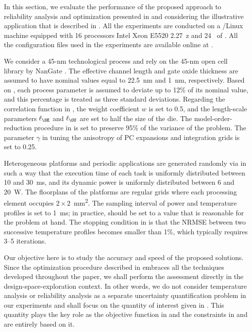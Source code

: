 In this section, we evaluate the performance of the proposed approach to
reliability analysis and optimization presented in
 and 
considering the illustrative application that is described in
. All the experiments are conducted on a
/Linux machine equipped with 16 processors Intel Xeon E5520
2.27~z and 24~ of . All the configuration files used in
the experiments are available online at \cite{eslab2015}.

We consider a 45-nm technological process and rely on the 45-nm open cell
library by NanGate \cite{nangate}. The effective channel length and gate oxide
thickness are assumed to have nominal values equal to 22.5~nm and 1~nm,
respectively. Based on  \cite{itrs}, each process parameter is assumed
to deviate up to 12\% of its nominal value, and this percentage is treated as
three standard deviations. Regarding the correlation function in
, the weight coefficient $w$ is set to 0.5, and the
length-scale parameters $\ell_\SE$ and $\ell_\OU$ are set to half the size of
the die. The model-order-reduction procedure in
 is set to preserve 95\% of the variance of the
problem. The parameter $\gamma$ in  tuning the
anisotropy of \ac{PC} expansions and integration grids is set to 0.25.

Heterogeneous platforms and periodic applications are generated randomly via
 \cite{dick1998} in such a way that the execution time of each task is
uniformly distributed between 10 and 30~ms, and its dynamic power is uniformly
distributed between 6 and 20~W. The floorplans of the platforms are regular
grids where each processing element occupies $2 \times 2$~mm\textsuperscript{2}.
The sampling interval \dt of power and temperature profiles is set to 1~ms; in
practice, \dt should be set to a value that is reasonable for the problem at
hand. The stopping condition in  is
that the \ac{NRMSE} between two successive temperature profiles becomes smaller
than 1\%, which typically requires 3--5 iterations.


Our objective here is to study the accuracy and speed of the proposed solutions.
Since the optimization procedure described in 
embraces all the techniques developed throughout the paper, we shall perform the
assessment directly in the design-space-exploration context. In other words, we
do not consider temperature analysis or reliability analysis as a separate
uncertainty quantification problem in our experiments and shall focus on the
quantity of interest given in . This quantity plays
the key role as the objective function in  and the constraints
in  and  are entirely
based on it.

